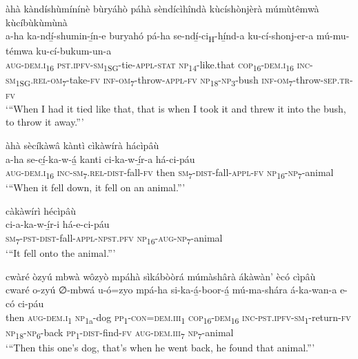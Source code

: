 àhà kàndíshùmínínè bùryáhò páhà sèndícìhîndà kùcíshònjèrà múmùtêmwà kùcíbùkùmùnà\\
\gll a-ha    ka-ndí̲-shumin-í̲n-e    buryahó pá-ha      se-ndí̲-ci\textsubscript{H}{}-hí̲nd-a      ku-cí-shonj-er-a    mú-mu-témwa   ku-cí-bukum-un-a\\
\textsc{aug}{}-\textsc{dem}.\textsc{i}\textsubscript{16}  \textsc{pst}.\textsc{ipfv}{}-\textsc{sm}\textsubscript{1SG}{}-tie-\textsc{appl}{}-\textsc{stat}  \textsc{np}\textsubscript{14}{}-like.that
\textsc{cop}\textsubscript{16}{}-\textsc{dem}.\textsc{i}\textsubscript{16}  \textsc{inc}{}-\textsc{sm}\textsubscript{1SG}.\textsc{rel}{}-\textsc{om}\textsubscript{7}{}-take-\textsc{fv}
\textsc{inf}{}-\textsc{om}\textsubscript{7}{}-throw-\textsc{appl}{}-\textsc{fv}  \textsc{np}\textsubscript{18}{}-\textsc{np}\textsubscript{3}{}-bush   \textsc{inf}{}-\textsc{om}\textsubscript{7}{}-throw-\textsc{sep}.\textsc{tr}{}-\textsc{fv}\\
\glt ‘“When I had it tied like that, that is when I took it and threw it into the bush, to throw it away.”’\bigskip

àhà sècíkàwâ kàntì cìkàwírà hácìpâù\\
\gll a-ha    se-cí̲-ka-w-á̲      kanti ci-ka-w-í̲r-a      há-ci-páu \\
\textsc{aug}{}-\textsc{dem}.\textsc{i}\textsubscript{16}  \textsc{inc}{}-\textsc{sm}\textsubscript{7}.\textsc{rel}{}-\textsc{dist}{}-fall-\textsc{fv}  then
\textsc{sm}\textsubscript{7}{}-\textsc{dist}{}-fall-\textsc{appl}{}-\textsc{fv}  \textsc{np}\textsubscript{16}{}-\textsc{np}\textsubscript{7}{}-animal\\
\glt ‘“When it fell down, it fell on an animal.”’\bigskip

càkàwírì hécìpâù\\
\gll ci-a-ka-w-í̲r-i      há-e-ci-páu\\
\textsc{sm}\textsubscript{7}{}-\textsc{pst}{}-\textsc{dist}{}-fall-\textsc{appl}{}-\textsc{npst}.\textsc{pfv}  \textsc{np}\textsubscript{16}{}-\textsc{aug}{}-\textsc{np}\textsubscript{7}{}-animal\\
\glt ‘“It fell onto the animal.”’\bigskip

\newpage
cwàré òzyú mbwà wôzyò mpáhà sìkábòòrá múmàshârà ákàwàn’ ècó cìpâù\\
\gll cwaré  o-zyú    ∅-mbwá  u-ó=zyo mpá-ha  si-ka-á̲-boor-á̲       mú-ma-shára á-ka-wan-a    e-có    ci-páu\\
then  \textsc{aug}{}-\textsc{dem}.\textsc{i}\textsubscript{1}  \textsc{np}\textsubscript{1a}{}-dog  \textsc{pp}\textsubscript{1}{}-\textsc{con}=\textsc{dem}.\textsc{iii}\textsubscript{1}
\textsc{cop}\textsubscript{16}{}-\textsc{dem}\textsubscript{16}  \textsc{inc}{}-\textsc{pst}.\textsc{ipfv}{}-\textsc{sm}\textsubscript{1}{}-return-\textsc{fv}  \textsc{np}\textsubscript{18}{}-\textsc{np}\textsubscript{6}{}-back
\textsc{pp}\textsubscript{1}{}-\textsc{dist}{}-find-\textsc{fv}  \textsc{aug}{}-\textsc{dem}.\textsc{iii}\textsubscript{7}  \textsc{np}\textsubscript{7}{}-animal\\
\glt ‘“Then this one’s dog, that’s when he went back, he found that animal.”’\bigskip

